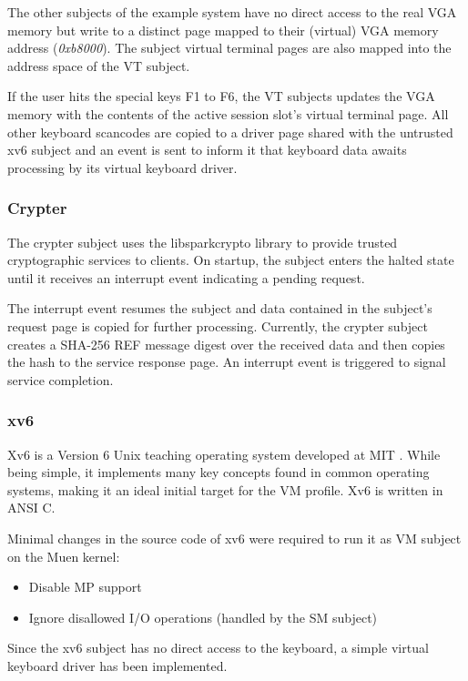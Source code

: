 The other subjects of the example system have no direct access to the real VGA
memory but write to a distinct page mapped to their (virtual) VGA memory
address (\emph{0xb8000}). The subject virtual terminal pages are also mapped
into the address space of the VT subject.

If the user hits the special keys F1 to F6, the VT subjects updates the VGA
memory with the contents of the active session slot's virtual terminal page.
All other keyboard scancodes are copied to a driver page shared with the
untrusted xv6 subject and an event is sent to inform it that keyboard data
awaits processing by its virtual keyboard driver.

\subsubsection{Crypter}
The crypter subject uses the libsparkcrypto \cite{libsparkcrypto} library to
provide trusted cryptographic services to clients. On startup, the subject
enters the halted state until it receives an interrupt event indicating a
pending request.

The interrupt event resumes the subject and data contained in the subject's
request page is copied for further processing. Currently, the crypter subject
creates a SHA-256 REF message digest over the received data and then copies the
hash to the service response page. An interrupt event is triggered to signal
service completion.

\subsubsection{xv6}
Xv6 is a Version 6 Unix \cite{wiki:unix6} teaching operating system
developed at MIT \cite{xv6}. While being simple, it implements many key
concepts found in common operating systems, making it an ideal initial target
for the VM profile. Xv6 is written in ANSI C.

Minimal changes in the source code of xv6 were required to run it as VM subject
on the Muen kernel:
\begin{itemize}
	\item Disable MP support
	\item Ignore disallowed I/O operations (handled by the SM subject)
\end{itemize}

Since the xv6 subject has no direct access to the keyboard, a simple virtual
keyboard driver has been implemented.

